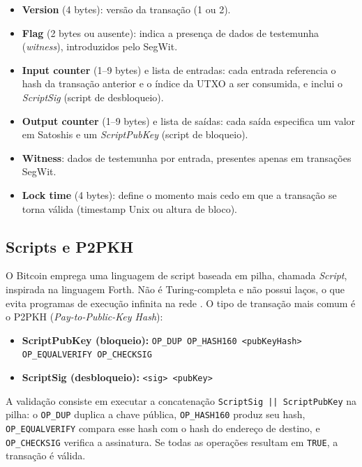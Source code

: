 \documentclass[12pt,a4paper]{report}
\begin{document}
\begin{itemize}
    \item \textbf{Version} (4 bytes): versão da transação (1 ou 2).
    \item \textbf{Flag} (2 bytes ou ausente): indica a presença de dados de testemunha (\textit{witness}), introduzidos pelo SegWit.
    \item \textbf{Input counter} (1--9 bytes) e lista de entradas: cada entrada referencia o hash da transação anterior e o índice da UTXO a ser consumida, e inclui o \textit{ScriptSig} (script de desbloqueio).
    \item \textbf{Output counter} (1--9 bytes) e lista de saídas: cada saída especifica um valor em Satoshis e um \textit{ScriptPubKey} (script de bloqueio).
    \item \textbf{Witness}: dados de testemunha por entrada, presentes apenas em transações SegWit.
    \item \textbf{Lock time} (4 bytes): define o momento mais cedo em que a transação se torna válida (timestamp Unix ou altura de bloco).
\end{itemize}

\subsection{Scripts e P2PKH}

O Bitcoin emprega uma linguagem de script baseada em pilha, chamada \textit{Script}, inspirada na linguagem Forth. Não é Turing-completa e não possui laços, o que evita programas de execução infinita na rede \cite{Bashir2023}. O tipo de transação mais comum é o P2PKH (\textit{Pay-to-Public-Key Hash}):

\begin{itemize}
    \item \textbf{ScriptPubKey (bloqueio):} \texttt{OP\_DUP OP\_HASH160 <pubKeyHash> OP\_EQUALVERIFY OP\_CHECKSIG}
    \item \textbf{ScriptSig (desbloqueio):} \texttt{<sig> <pubKey>}
\end{itemize}

A validação consiste em executar a concatenação \texttt{ScriptSig || ScriptPubKey} na pilha: o \texttt{OP\_DUP} duplica a chave pública, \texttt{OP\_HASH160} produz seu hash, \texttt{OP\_EQUALVERIFY} compara esse hash com o hash do endereço de destino, e \texttt{OP\_CHECKSIG} verifica a assinatura. Se todas as operações resultam em \texttt{TRUE}, a transação é válida.
\end{document}
